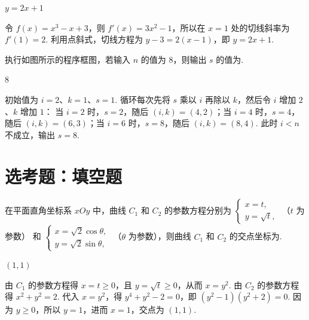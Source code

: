 \begin{answer}
\(y=2x+1\)
\end{answer}

\begin{solution}
令 \(f(x)=x^3-x+3\)，则 \(f'(x)=3x^2-1\)，所以在 \(x=1\) 处的切线斜率为 \(f'(1)=2\). 利用点斜式，切线方程为 \(y-3=2(x-1)\)，即 \(y=2x+1\).
\end{solution}

\begin{problem}
执行如图所示的程序框图，若输入 \(n\) 的值为 8，则输出 \(s\) 的值为\fillinblank{}.

\end{problem}

\begin{answer}
8
\end{answer}

\begin{solution}
初始值为 \(i=2\)、\(k=1\)、\(s=1\). 循环每次先将 \(s\) 乘以 \(i\) 再除以 \(k\)，然后令 \(i\) 增加 \(2\)、\(k\) 增加 \(1\)：
当 \(i=2\) 时，\(s=2\)，随后 \((i,k)=(4,2)\)；当 \(i=4\) 时，\(s=4\)，随后 \((i,k)=(6,3)\)；当 \(i=6\) 时，\(s=8\)，随后 \((i,k)=(8,4)\). 此时 \(i<n\) 不成立，输出 \(s=8\).
\end{solution}

\section{选考题：填空题}

\begin{problem}
在平面直角坐标系 \(xOy\) 中，曲线 \(C_1\) 和 \(C_2\) 的参数方程分别为 \(\begin{cases}
x = t,\\
y = \sqrt{t},
\end{cases}\) （\(t\) 为参数） 和 \(\begin{cases}
x = \sqrt{2}\cos \theta,\\
y = \sqrt{2}\sin \theta,
\end{cases}\) （\(\theta\) 为参数），则曲线 \(C_1\) 和 \(C_2\) 的交点坐标为\fillinblank{}.
\end{problem}

\begin{answer}
\((1,1)\)
\end{answer}

\begin{solution}
由 \(C_1\) 的参数方程得 \(x=t\geqslant0\)，且 \(y=\sqrt{t}\geqslant0\)，从而 \(x=y^2\). 由 \(C_2\) 的参数方程得 \(x^2+y^2=2\). 代入 \(x=y^2\)，得 \(y^4+y^2-2=0\)，即 \((y^2-1)(y^2+2)=0\). 因为 \(y\geqslant0\)，所以 \(y=1\)，进而 \(x=1\)，交点为 \((1,1)\).
\end{solution}

